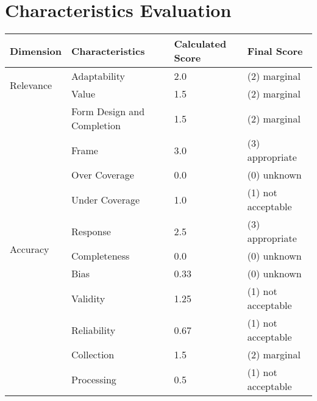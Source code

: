 \newpage
\section{Characteristics Evaluation}

\begin{table}[htbp]
    \centering

    \begin{tabular}{llll}
        \toprule
        Dimension                           & Characteristics               & Calculated Score  & Final Score           \\ \midrule
        \multirow{2}{*}{Relevance}          & Adaptability                  & 2.0               & (2) marginal          \\
                                            & Value                         & 1.5               & (2) marginal          \\ \midrule
        \multirow{13}{*}{Accuracy}          & Form Design and Completion    & 1.5               & (2) marginal          \\
                                            & Frame                         & 3.0               & (3) appropriate       \\
                                            & Over Coverage                 & 0.0               & (0) unknown           \\
                                            & Under Coverage                & 1.0               & (1) not acceptable    \\
                                            & Response                      & 2.5               & (3) appropriate       \\
                                            & Completeness                  & 0.0               & (0) unknown           \\
                                            & Bias                          & 0.33              & (0) unknown           \\
                                            & Validity                      & 1.25              & (1) not acceptable    \\
                                            & Reliability                   & 0.67              & (1) not acceptable    \\
                                            & Collection                    & 1.5               & (2) marginal          \\
                                            & Processing                    & 0.5               & (1) not acceptable    \\

\end{tabular}
\end{table}
